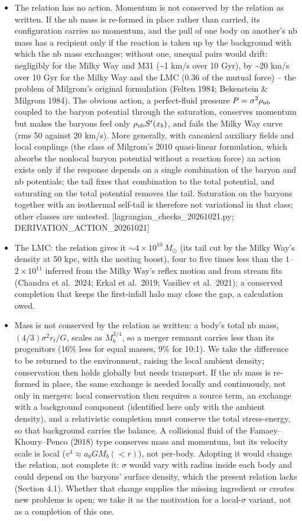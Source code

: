 \documentclass[
  10pt,
]{article}
\begin{document}
\begin{itemize}
\item The relation has no action. Momentum is not conserved by the relation as written. If the nb mass is re-formed in place rather than carried, its configuration carries no momentum, and the pull of one body on another's nb mass has a recipient only if the reaction is taken up by the background with which the nb mass exchanges; without one, unequal pairs would drift: negligibly for the Milky Way and M31 (\textasciitilde{}1 km/s over 10 Gyr), by \textasciitilde{}20 km/s over 10 Gyr for the Milky Way and the LMC (0.36 of the mutual force) -- the problem of Milgrom's original formulation (Felten 1984; Bekenstein \& Milgrom 1984). The obvious action, a perfect-fluid pressure $P=\sigma^2\rho_{\rm nb}$ coupled to the baryon potential through the saturation, conserves momentum but makes the baryons feel only $\rho_{\rm nb}S'(x_b)$, and fails the Milky Way curve (rms 50 against 20 km/s). More generally, with canonical auxiliary fields and local couplings (the class of Milgrom's 2010 quasi-linear formulation, which absorbs the nonlocal baryon potential without a reaction force) an action exists only if the response depends on a single combination of the baryon and nb potentials; the tail fixes that combination to the total potential, and saturating on the total potential removes the tail. Saturation on the baryons together with an isothermal self-tail is therefore not variational in that class; other classes are untested. {[}lagrangian\_checks\_20261021.py; DERIVATION\_ACTION\_20261021{]}
\item The LMC: the relation gives it $\sim4\times10^{10}\,M_\odot$ (its tail cut by the Milky Way's density at 50 kpc, with the nesting boost), four to five times less than the $1$--$2\times10^{11}$ inferred from the Milky Way's reflex motion and from stream fits (Chandra et al.~2024; Erkal et al.~2019; Vasiliev et al.~2021); a conserved completion that keeps the first-infall halo may close the gap, a calculation owed.
\item Mass is not conserved by the relation as written: a body's total nb mass, $(4/3)\sigma^2r_t/G$, scales as $M_b^{3/4}$, so a merger remnant carries less than its progenitors (16\% less for equal masses, 9\% for 10:1). We take the difference to be returned to the environment, raising the local ambient density; conservation then holds globally but needs transport. If the nb mass is re-formed in place, the same exchange is needed locally and continuously, not only in mergers: local conservation then requires a source term, an exchange with a background component (identified here only with the ambient density), and a relativistic completion must conserve the total stress-energy, so that background carries the balance. A collisional fluid of the Famaey--Khoury--Penco (2018) type conserves mass and momentum, but its velocity scale is local ($v^4\approx a_0GM_b(<r)$), not per-body. Adopting it would change the relation, not complete it: $\sigma$ would vary with radius inside each body and could depend on the baryons' surface density, which the present relation lacks (Section 4.1). Whether that change supplies the missing ingredient or creates new problems is open; we take it as the motivation for a local-$\sigma$ variant, not as a completion of this one.

\end{itemize}
\end{document}
